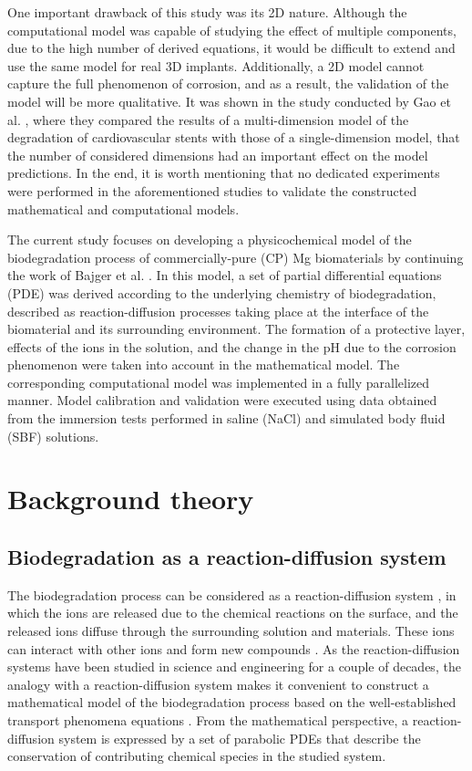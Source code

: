 One important drawback of this study was its 2D nature. Although the computational model was capable of studying the effect of multiple components, due to the high number of derived equations, it would be difficult to extend and use the same model for real 3D implants. Additionally, a 2D model cannot capture the full phenomenon of corrosion, and as a result, the validation of the model will be more qualitative. It was shown in the study conducted by Gao et al. \cite{Gao2018}, where they compared the results of a multi-dimension model of the degradation of cardiovascular stents with those of a single-dimension model, that the number of considered dimensions had an important effect on the model predictions. In the end, it is worth mentioning that no dedicated experiments were performed in the aforementioned studies to validate the constructed mathematical and computational models.


The current study focuses on developing a physicochemical model of the biodegradation process of commercially-pure ({CP}) Mg biomaterials by continuing the work of Bajger et al. \cite{Bajger2016}. In this model, a set of partial differential equations ({PDE}) was derived according to the underlying chemistry of biodegradation, described as reaction-diffusion processes taking place at the interface of the biomaterial and its surrounding environment. The formation of a protective layer, effects of the ions in the solution, and the change in the pH due to the corrosion phenomenon were taken into account in the mathematical model. The corresponding computational model was  implemented in a fully parallelized manner. Model calibration and validation were executed using data obtained from the immersion tests performed in saline (NaCl) and simulated body fluid ({SBF}) solutions.

\section{Background theory}

\subsection{Biodegradation as a reaction-diffusion system}

The biodegradation process can be considered as a reaction-diffusion system \cite{wang2008}, in which the ions are released due to the chemical reactions on the surface, and the released ions diffuse through the surrounding solution and materials. These ions can interact with other ions and form new compounds \cite{Mei2020}. As the reaction-diffusion systems have been studied in science and engineering for a couple of decades, the analogy with a reaction-diffusion system makes it convenient to construct a mathematical model of the biodegradation process based on the well-established transport phenomena equations \cite{Grindrod1996}. From the mathematical perspective, a reaction-diffusion system is expressed by a set of parabolic {PDE}s that describe the conservation of contributing chemical species in the studied system.


